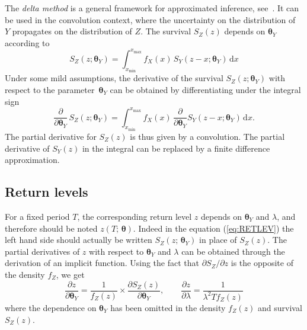 \documentclass[11pt,a4paper]{report}\usepackage[]{graphicx}\usepackage[]{color}
\newcommand{\m}{\mathbf}
\newcommand{\bs}{\boldsymbol}
\newcommand{\Low}[1]{#1_{\mathrm{min}}}
\newcommand{\Up}[1]{#1_{\mathrm{max}}}
\newenvironment{Prov}
   {\medskip \par \noindent%
    \sf \color{blue} }%
  {\medskip \par}
\begin{document}
The \textit{delta method} is a general framework for approximated
inference, see~\cite{COLESBOOK}. It can be used in the convolution
context, where the uncertainty on the distribution of~$Y$ propagates
on the distribution of $Z$. The survival $S_Z(z)$ depends on
$\bs{\theta}_Y$ according to
$$
   S_Z(z;\bs{\theta}_Y) = \int_{\Low{x}}^{\Up{x}} 
   f_X(x) \,S_Y(z-x;\bs{\theta}_Y) \,\mathrm{d}x
$$
Under some mild assumptions, the derivative of the survival $
S_Z(z;\bs{\theta}_Y)$ with respect to the parameter~$\bs{\theta}_Y$
can be obtained by differentiating under the integral sign
$$
\frac{\partial}{\partial \bs{\theta}_Y} \, S_Z(z;\bs{\theta}_Y) =
\int_{\Low{x}}^{\Up{x}} f_X(x) \,
\frac{\partial}{\partial \bs{\theta}_Y} S_Y(z-x;\bs{\theta}_Y)
\,\mathrm{d}x.
$$
The partial derivative for $S_Z(z)$ is thus given by a convolution.
The partial derivative of $S_Y(z)$ in the integral can be replaced by
a finite difference approximation.

\subsection{Return levels}
For a fixed period $T$, the corresponding return level $z$ depends on
$\bs{\theta}_Y$ and $\lambda$, and therefore should be noted
$z(T;\,\bs{\theta})$. Indeed in the equation (\ref{eq:RETLEV}) the left hand
side should actually be written $S_Z(z;\,\bs{\theta}_Y)$ in place of $S_Z(z)$. The
partial derivatives of $z$ with respect to $\bs{\theta}_Y$ and $\lambda$ can be
obtained through the derivation of an implicit function.
Using the fact that $\partial S_Z/\partial z$ is the opposite of the density
$f_Z$, we get
 \begin{equation}
    \label{eq:DERT}
 \frac{\partial z}{\partial \bs{\theta}_Y}= 
 \frac{1}{f_Z(z)} \times \frac{\partial S_Z(z)}{\partial \bs{\theta}_Y},%
 \qquad 
 \frac{\partial z}{\partial \lambda}= 
 \frac{1}{\lambda^2 T f_Z(z)}
\end{equation}
where the dependence on $\bs{\theta}_Y$ has been omitted in the density $f_Z(z)$
and survival $S_Z(z)$.
\end{document}
